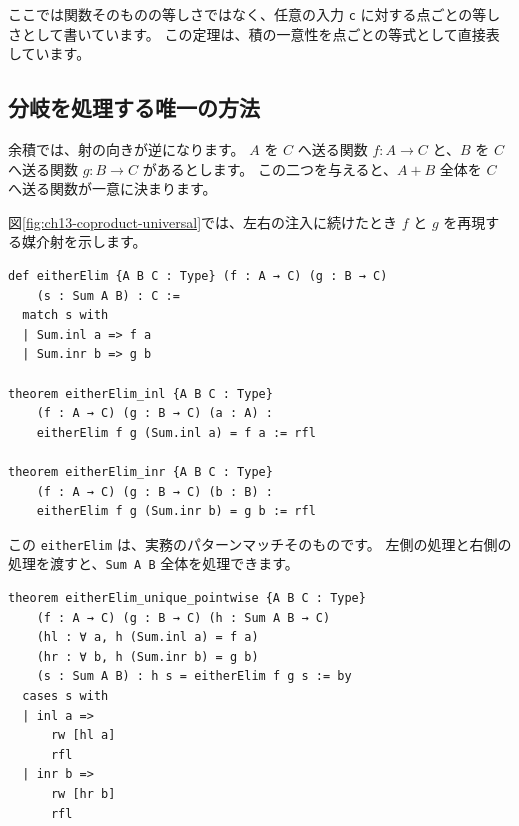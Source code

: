 ここでは関数そのものの等しさではなく、任意の入力 \texttt{c} に対する点ごとの等しさとして書いています。
この定理は、積の一意性を点ごとの等式として直接表しています。

\subsection{分岐を処理する唯一の方法}

余積では、射の向きが逆になります。
\(A\) を \(C\) へ送る関数 \(f : A \to C\) と、\(B\) を \(C\) へ送る関数 \(g : B \to C\) があるとします。
この二つを与えると、\(A+B\) 全体を \(C\) へ送る関数が一意に決まります。

図\ref{fig:ch13-coproduct-universal}では、左右の注入に続けたとき \(f\) と \(g\) を再現する媒介射を示します。


\begin{listing}[htbp]
\begin{verbatim}
def eitherElim {A B C : Type} (f : A → C) (g : B → C)
    (s : Sum A B) : C :=
  match s with
  | Sum.inl a => f a
  | Sum.inr b => g b

theorem eitherElim_inl {A B C : Type}
    (f : A → C) (g : B → C) (a : A) :
    eitherElim f g (Sum.inl a) = f a := rfl

theorem eitherElim_inr {A B C : Type}
    (f : A → C) (g : B → C) (b : B) :
    eitherElim f g (Sum.inr b) = g b := rfl
\end{verbatim}
\caption{\texttt{eitherElim}}
\label{lst:ch13_coproduct_universal}
\end{listing}

この \texttt{eitherElim} は、実務のパターンマッチそのものです。
左側の処理と右側の処理を渡すと、\texttt{Sum A B} 全体を処理できます。

\begin{listing}[htbp]
\begin{verbatim}
theorem eitherElim_unique_pointwise {A B C : Type}
    (f : A → C) (g : B → C) (h : Sum A B → C)
    (hl : ∀ a, h (Sum.inl a) = f a)
    (hr : ∀ b, h (Sum.inr b) = g b)
    (s : Sum A B) : h s = eitherElim f g s := by
  cases s with
  | inl a =>
      rw [hl a]
      rfl
  | inr b =>
      rw [hr b]
      rfl
\end{verbatim}
\caption{\texttt{eitherElim\_unique\_pointwise}}
\label{lst:ch13_coproduct_unique}
\end{listing}

